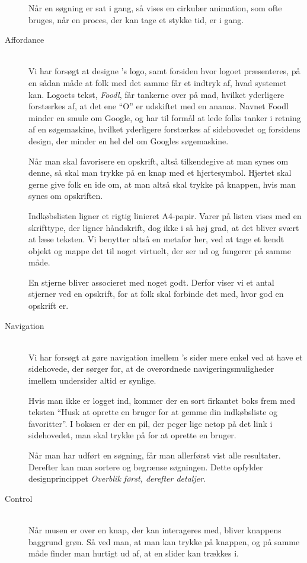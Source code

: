 \begin{description}
Når en søgning er sat i gang, så vises en cirkulær animation, som ofte bruges, når en proces, der kan tage et stykke tid, er i gang.   

\item[Affordance] \hfill \\
Vi har forsøgt at designe \Foodl{}'s logo, samt forsiden hvor logoet præsenteres, på en sådan måde at folk med det samme får et indtryk af, hvad systemet kan. Logoets tekst, \textit{Foodl}, får tankerne over på mad, hvilket yderligere forstærkes af, at det ene ``O'' er udskiftet med en ananas. Navnet Foodl minder en smule om Google, og har til formål at lede folks tanker i retning af en søgemaskine, hvilket yderligere forstærkes af sidehovedet og forsidens design, der minder en hel del om Googles søgemaskine.

Når man skal favorisere en opskrift, altså tilkendegive at man synes om denne, så skal man trykke på en knap med et hjertesymbol. Hjertet skal gerne give folk en ide om, at man altså skal trykke på knappen, hvis man synes om opskriften.

Indkøbslisten ligner et rigtig linieret A4-papir. Varer på listen vises med en skrifttype, der ligner håndskrift, dog ikke i så høj grad, at det bliver svært at læse teksten. Vi benytter altså en metafor her, ved at tage et kendt objekt og mappe det til noget virtuelt, der ser ud og fungerer på samme måde.

En stjerne bliver associeret med noget godt. Derfor viser vi et antal stjerner ved en opskrift, for at folk skal forbinde det med, hvor god en opskrift er.

\item[Navigation] \hfill \\
Vi har forsøgt at gøre navigation imellem \Foodl's sider mere enkel ved at have et sidehovede, der sørger for, at de overordnede navigeringsmuligheder imellem undersider altid er synlige.

Hvis man ikke er logget ind, kommer der en sort firkantet boks frem med teksten ``Husk at oprette en bruger for at gemme din indkøbsliste og favoritter''. I boksen er der en pil, der peger lige netop på det link i sidehovedet, man skal trykke på for at oprette en bruger.

Når man har udført en søgning, får man allerførst vist alle resultater. Derefter kan man sortere og begrænse søgningen. Dette opfylder designprincippet \textit{Overblik først, derefter detaljer}.

\item[Control] \hfill \\
Når musen er over en knap, der kan interageres med, bliver knappens baggrund grøn. Så ved man, at man kan trykke på knappen, og på samme måde finder man hurtigt ud af, at en slider kan trækkes i.
  

\end{description}

